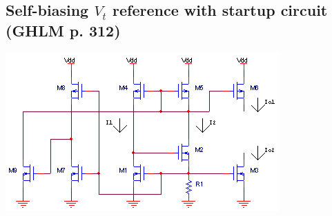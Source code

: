 \subsection{Self-biasing $V_{t}$ reference with startup circuit (GHLM p. 312)}
\begin{center}
	\includegraphics{schematics/self-biasing_Vt_reference_startup.PNG}
\end{center}



